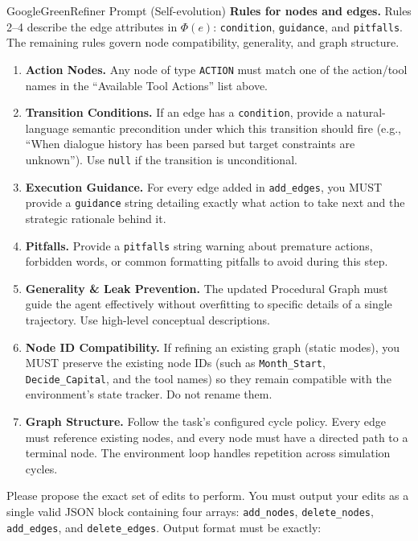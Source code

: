 \begin{tracebox}{GoogleGreen}{Refiner Prompt (Self-evolution)}
\textbf{Rules for nodes and edges.} Rules 2--4 describe the edge attributes in $\Phi(e)$: \texttt{condition}, \texttt{guidance}, and \texttt{pitfalls}. The remaining rules govern node compatibility, generality, and graph structure.
\begin{enumerate}[leftmargin=14pt, itemsep=1pt, topsep=2pt]
    \item \textbf{Action Nodes.} Any node of type \texttt{ACTION} must match one of the action/tool names in the ``Available Tool Actions'' list above.
    \item \textbf{Transition Conditions.} If an edge has a \texttt{condition}, provide a natural-language semantic precondition under which this transition should fire (e.g., ``When dialogue history has been parsed but target constraints are unknown''). Use \texttt{null} if the transition is unconditional.
    \item \textbf{Execution Guidance.} For every edge added in \texttt{add\_edges}, you MUST provide a \texttt{guidance} string detailing exactly what action to take next and the strategic rationale behind it.
    \item \textbf{Pitfalls.} Provide a \texttt{pitfalls} string warning about premature actions, forbidden words, or common formatting pitfalls to avoid during this step.
    \item \textbf{Generality \& Leak Prevention.} The updated Procedural Graph must guide the agent effectively without overfitting to specific details of a single trajectory. Use high-level conceptual descriptions. 
    \item \textbf{Node ID Compatibility.} If refining an existing graph (static modes), you MUST preserve the existing node IDs (such as \texttt{Month\_Start}, \texttt{Decide\_Capital}, and the tool names) so they remain compatible with the environment's state tracker. Do not rename them.
    \item \textbf{Graph Structure.} Follow the task's configured cycle policy. Every edge must reference existing nodes, and every node must have a directed path to a terminal node. The environment loop handles repetition across simulation cycles.
\end{enumerate}

Please propose the exact set of edits to perform. You must output your edits as a single valid JSON block containing four arrays: \texttt{add\_nodes}, \texttt{delete\_nodes}, \texttt{add\_edges}, and \texttt{delete\_edges}. Output format must be exactly:


\end{tracebox}
